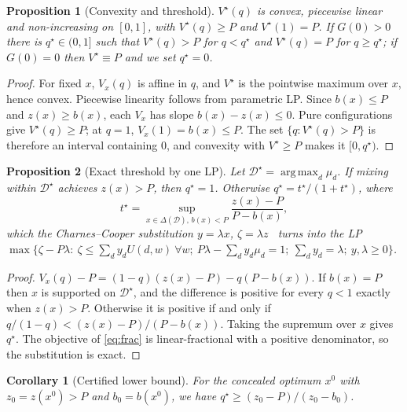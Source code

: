 \documentclass[letterpaper,journal]{IEEEtran}
\newtheorem{proposition}{Proposition}
\newtheorem{corollary}{Corollary}
\theoremstyle{remark}
\newcommand{\D}{\mathcal{D}}
\DeclareMathOperator*{\argmax}{arg\,max}
\begin{document}
\begin{proposition}[Convexity and threshold]\label{prop:convex}
$V^\star(q)$ is convex, piecewise linear and non-increasing on $[0,1]$, with $V^\star(q)\ge P$ and $V^\star(1)=P$. If $G(0)>0$ there is $q^\star\in(0,1]$ such that $V^\star(q)>P$ for $q<q^\star$ and $V^\star(q)=P$ for $q\ge q^\star$; if $G(0)=0$ then $V^\star\equiv P$ and we set $q^\star=0$.
\end{proposition}
\begin{proof}
For fixed $x$, $V_x(q)$ is affine in $q$, and $V^\star$ is the pointwise maximum over $x$, hence convex. Piecewise linearity follows from parametric LP. Since $b(x)\le P$ and $z(x)\ge b(x)$, each $V_x$ has slope $b(x)-z(x)\le0$. Pure configurations give $V^\star(q)\ge P$; at $q=1$, $V_x(1)=b(x)\le P$. The set $\{q:V^\star(q)>P\}$ is therefore an interval containing $0$, and convexity with $V^\star\ge P$ makes it $[0,q^\star)$.
\end{proof}

\begin{proposition}[Exact threshold by one LP]\label{prop:qstar}
Let $\D^\star=\argmax_d\mu_d$. If mixing within $\D^\star$ achieves $z(x)>P$, then $q^\star=1$. Otherwise $q^\star=t^\star/(1+t^\star)$, where
\begin{equation}\label{eq:frac}
t^\star=\sup_{x\in\Delta(\D),\,b(x)<P}\frac{z(x)-P}{P-b(x)},
\end{equation}
which the Charnes--Cooper substitution $y=\lambda x$, $\zeta=\lambda z$~\cite{charnes1962} turns into the LP
$\max\{\zeta-P\lambda:\ \zeta\le\textstyle\sum_d y_dU(d,w)\ \forall w;\ P\lambda-\sum_d y_d\mu_d=1;\ \sum_dy_d=\lambda;\ y,\lambda\ge0\}$.
\end{proposition}
\begin{proof}
$V_x(q)-P=(1-q)(z(x)-P)-q(P-b(x))$. If $b(x)=P$ then $x$ is supported on $\D^\star$, and the difference is positive for every $q<1$ exactly when $z(x)>P$. Otherwise it is positive if and only if $q/(1-q)<(z(x)-P)/(P-b(x))$. Taking the supremum over $x$ gives $q^\star$. The objective of \eqref{eq:frac} is linear-fractional with a positive denominator, so the substitution is exact.
\end{proof}

\begin{corollary}[Certified lower bound]\label{cor:lb}
For the concealed optimum $x^0$ with $z_0=z(x^0)>P$ and $b_0=b(x^0)$, we have $q^\star\ge (z_0-P)/(z_0-b_0)$.
\end{corollary}
\end{document}
